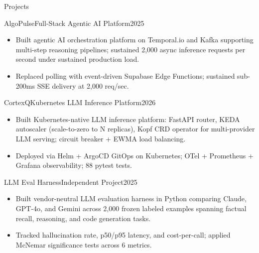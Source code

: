 \documentclass[]{mcdowellcv}
\begin{document}
\begin{cvsection}{Projects}
  \begin{cvsubsection}{AlgoPulse}{Full-Stack Agentic AI Platform}{2025}
    \begin{itemize}
      \item Built agentic AI orchestration platform on Temporal.io and Kafka supporting multi-step reasoning pipelines; sustained 2,000 async inference requests per second under sustained production load.
      \item Replaced polling with event-driven Supabase Edge Functions; sustained sub-200ms SSE delivery at 2,000 req/sec.
    \end{itemize}
    \vspace{-1.5pt}
  \end{cvsubsection}

  \begin{cvsubsection}{CortexQ}{Kubernetes LLM Inference Platform}{2026}
    \begin{itemize}
      \item Built Kubernetes-native LLM inference platform: FastAPI router, KEDA autoscaler (scale-to-zero to N replicas), Kopf CRD operator for multi-provider LLM serving; circuit breaker + EWMA load balancing.
      \item Deployed via Helm + ArgoCD GitOps on Kubernetes; OTel + Prometheus + Grafana observability; 88 pytest tests.
    \end{itemize}
    \vspace{-1.5pt}
  \end{cvsubsection}

  \begin{cvsubsection}{LLM Eval Harness}{Independent Project}{2025}
    \begin{itemize}
      \item Built vendor-neutral LLM evaluation harness in Python comparing Claude, GPT-4o, and Gemini across 2,000 frozen labeled examples spanning factual recall, reasoning, and code generation tasks.
      \item Tracked hallucination rate, p50/p95 latency, and cost-per-call; applied McNemar significance tests across 6 metrics.
    \end{itemize}
  \end{cvsubsection}
\end{cvsection}
\end{document}
